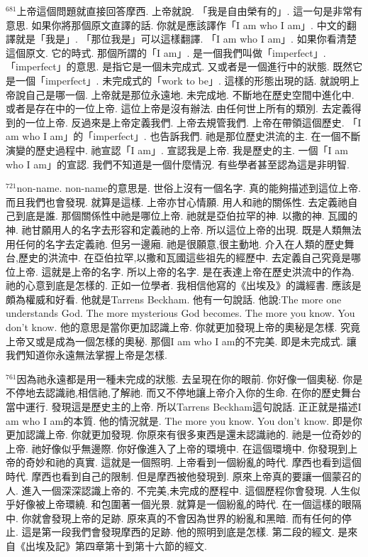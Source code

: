 \documentclass{book}
\begin{document}
$^{681}$上帝這個問題就直接回答摩西.
上帝就說.
「我是自由榮有的」.
這一句是非常有意思.
如果你將那個原文直譯的話.
你就是應該譯作「I am who I am」.
中文的翻譯就是「我是」.
「那位我是」可以這樣翻譯.
「I am who I am」.
如果你看清楚這個原文.
它的時式.
那個所謂的「I am」.
是一個我們叫做「imperfect」.
「imperfect」的意思.
是指它是一個未完成式.
又或者是一個進行中的狀態.
既然它是一個「imperfect」.
未完成式的「work to be」.
這樣的形態出現的話.
就說明上帝說自己是哪一個.
上帝就是那位永遠地.
未完成地.
不斷地在歷史空間中進化中.
或者是存在中的一位上帝.
這位上帝是沒有辦法.
由任何世上所有的類別.
去定義得到的一位上帝.
反過來是上帝定義我們.
上帝去規管我們.
上帝在帶領這個歷史.
「I am who I am」的「imperfect」.
也告訴我們.
祂是那位歷史洪流的主.
在一個不斷演變的歷史過程中.
祂宣認「I am」.
宣認我是上帝.
我是歷史的主.
一個「I am who I am」的宣認.
我們不知道是一個什麼情況.
有些學者甚至認為這是非明智.

$^{721}$non-name.
non-name的意思是.
世俗上沒有一個名字.
真的能夠描述到這位上帝.
而且我們也會發現.
就算是這樣.
上帝亦甘心情願.
用人和祂的關係性.
去定義祂自己到底是誰.
那個關係性中祂是哪位上帝.
祂就是亞伯拉罕的神.
以撒的神.
瓦國的神.
祂甘願用人的名字去形容和定義祂的上帝.
所以這位上帝的出現.
既是人類無法用任何的名字去定義祂.
但另一邊廂.
祂是很願意,很主動地.
介入在人類的歷史舞台,歷史的洪流中.
在亞伯拉罕,以撒和瓦國這些祖先的經歷中.
去定義自己究竟是哪位上帝.
這就是上帝的名字.
所以上帝的名字.
是在表達上帝在歷史洪流中的作為.
祂的心意到底是怎樣的.
正如一位學者.
我相信他寫的《出埃及》的識經書.
應該是頗為權威和好看.
他就是Tarrens Beckham.
他有一句說話.
他說:The more one understands God.
The more mysterious God becomes.
The more you know.
You don't know.
他的意思是當你更加認識上帝.
你就更加發現上帝的奧秘是怎樣.
究竟上帝又或是成為一個怎樣的奧秘.
那個I am who I am的不完美.
即是未完成式.
讓我們知道你永遠無法掌握上帝是怎樣.

$^{761}$因為祂永遠都是用一種未完成的狀態.
去呈現在你的眼前.
你好像一個奧秘.
你是不停地去認識祂,相信祂,了解祂.
而又不停地讓上帝介入你的生命.
在你的歷史舞台當中運行.
發現這是歷史主的上帝.
所以Tarrens Beckham這句說話.
正正就是描述I am who I am的本質.
他的情況就是.
The more you know.
You don't know.
即是你更加認識上帝.
你就更加發現.
你原來有很多東西是還未認識祂的.
祂是一位奇妙的上帝.
祂好像似乎無邊際.
你好像進入了上帝的環境中.
在這個環境中.
你發現到上帝的奇妙和祂的真實.
這就是一個照明.
上帝看到一個紛亂的時代.
摩西也看到這個時代.
摩西也看到自己的限制.
但是摩西被他發現到.
原來上帝真的要讓一個蒙召的人.
進入一個深深認識上帝的.
不完美,未完成的歷程中.
這個歷程你會發現.
人生似乎好像被上帝環繞.
和包圍著一個光景.
就算是一個紛亂的時代.
在一個這樣的眼隔中.
你就會發現上帝的足跡.
原來真的不會因為世界的紛亂和黑暗.
而有任何的停止.
這是第一段我們會發現摩西的足跡.
他的照明到底是怎樣.
第二段的經文.
是來自《出埃及記》第四章第十到第十六節的經文.
\end{document}
